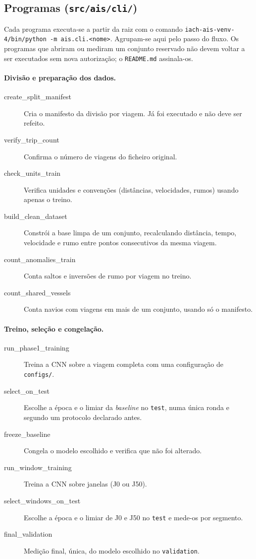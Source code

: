 \documentclass[11pt,a4paper]{article}
\newcommand{\f}[1]{\texttt{#1}}
\begin{document}
\subsection{Programas (\f{src/ais/cli/})}

Cada programa executa-se a partir da raiz com o comando
\f{iach-ais-venv-4/bin/python -m ais.cli.<nome>}. Agrupam-se aqui pelo passo do fluxo. Os
programas que abriram ou mediram um conjunto reservado não devem voltar a ser executados sem nova
autorização; o \f{README.md} assinala-os.

\paragraph{Divisão e preparação dos dados.}
\begin{description}
\item[create\_split\_manifest] Cria o manifesto da divisão por viagem. Já foi executado e não deve
  ser refeito.
\item[verify\_trip\_count] Confirma o número de viagens do ficheiro original.
\item[check\_units\_train] Verifica unidades e convenções (distâncias, velocidades, rumos) usando
  apenas o treino.
\item[build\_clean\_dataset] Constrói a base limpa de um conjunto, recalculando distância, tempo,
  velocidade e rumo entre pontos consecutivos da mesma viagem.
\item[count\_anomalies\_train] Conta saltos e inversões de rumo por viagem no treino.
\item[count\_shared\_vessels] Conta navios com viagens em mais de um conjunto, usando só o
  manifesto.
\end{description}

\paragraph{Treino, seleção e congelação.}
\begin{description}
\item[run\_phase1\_training] Treina a CNN sobre a viagem completa com uma configuração de
  \f{configs/}.
\item[select\_on\_test] Escolhe a época e o limiar da \emph{baseline} no \f{test}, numa única
  ronda e segundo um protocolo declarado antes.
\item[freeze\_baseline] Congela o modelo escolhido e verifica que não foi alterado.
\item[run\_window\_training] Treina a CNN sobre janelas (J0 ou J50).
\item[select\_windows\_on\_test] Escolhe a época e o limiar de J0 e J50 no \f{test} e mede-os por
  segmento.
\item[final\_validation] Medição final, única, do modelo escolhido no \f{validation}.
\end{description}
\end{document}
